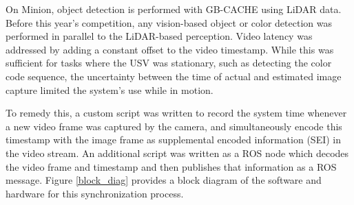 \documentclass{erauthesis}
\begin{document}
On Minion, object detection is performed with GB-CACHE \cite{GBCACHE} using LiDAR data.
Before this year's competition, any vision-based object or color detection was performed in parallel to the LiDAR-based perception. 
Video latency was addressed by adding a constant offset to the video timestamp.
While this was sufficient for tasks where the USV was stationary, such as detecting the color code sequence, the uncertainty between the time of actual and estimated image capture limited the system's use while in motion.

To remedy this, a custom script was written to record the system time whenever a new video frame was captured by the camera, and simultaneously encode this timestamp with the image frame as supplemental encoded information (SEI) in the video stream.
An additional script was written as a ROS node which decodes the video frame and timestamp and then publishes that information as a ROS message.
Figure \ref{block_diag} provides a block diagram of the software and hardware for this synchronization process.


\end{document}
